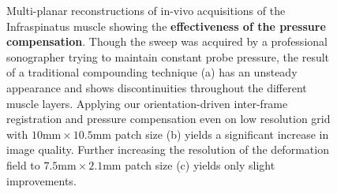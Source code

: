 \begin{figure}[ht]
	\centering
	\;
	\;
	\caption{
		Multi-planar reconstructions of in-vivo acquisitions of the Infraspinatus muscle showing the \textbf{effectiveness of the pressure compensation}.
		Though the sweep was acquired by a professional sonographer trying to maintain constant probe pressure, the result of a traditional compounding technique (a) has an unsteady appearance and shows discontinuities throughout the different muscle layers.
		Applying our orientation-driven inter-frame registration and pressure compensation even on low resolution grid with $10\text{mm} \times 10.5\text{mm}$ patch size (b) yields a significant increase in image quality.
		Further increasing the resolution of the deformation field to $7.5\text{mm} \times 2.1\text{mm}$ patch size (c) yields only slight improvements.
	}
	\label{fig:uscompounding:comparison-registration}
\end{figure}

